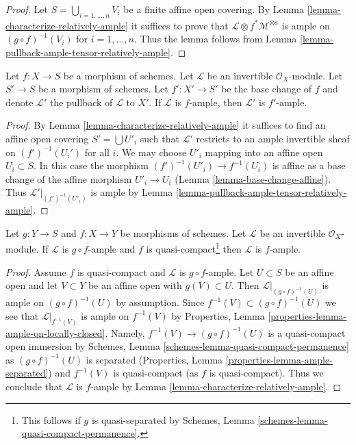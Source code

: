 \begin{proof}
Let $S = \bigcup_{i = 1, \ldots, n} V_i$ be a finite affine open covering.
By Lemma \ref{lemma-characterize-relatively-ample}
it suffices to prove that 
$\mathcal{L} \otimes f^*\mathcal{M}^{\otimes a}$
is ample on $(g \circ f)^{-1}(V_i)$ for $i = 1, \ldots, n$.
Thus the lemma follows from
Lemma \ref{lemma-pullback-ample-tensor-relatively-ample}.
\end{proof}

\begin{lemma}
\label{lemma-ample-base-change}
Let $f : X \to S$ be a morphism of schemes.
Let $\mathcal{L}$ be an invertible $\mathcal{O}_X$-module.
Let $S' \to S$ be a morphism of schemes.
Let $f' : X' \to S'$ be the base change of $f$ and denote
$\mathcal{L}'$ the pullback of $\mathcal{L}$ to $X'$.
If $\mathcal{L}$ is $f$-ample, then $\mathcal{L}'$ is $f'$-ample.
\end{lemma}

\begin{proof}
By Lemma \ref{lemma-characterize-relatively-ample} it suffices
to find an affine open covering $S' = \bigcup U'_i$
such that $\mathcal{L}'$ restricts to an ample invertible
sheaf on $(f')^{-1}(U_i')$ for all $i$. We may choose $U'_i$
mapping into an affine open $U_i \subset S$. In this case the
morphism $(f')^{-1}(U'_i) \to f^{-1}(U_i)$ is affine as a base
change of the affine morphism $U'_i \to U_i$
(Lemma \ref{lemma-base-change-affine}). Thus
$\mathcal{L}'|_{(f')^{-1}(U'_i)}$ is ample by
Lemma \ref{lemma-pullback-ample-tensor-relatively-ample}.
\end{proof}

\begin{lemma}
\label{lemma-ample-permanence}
Let $g : Y \to S$ and $f : X \to Y$ be morphisms of schemes.
Let $\mathcal{L}$ be an invertible $\mathcal{O}_X$-module.
If $\mathcal{L}$ is $g \circ f$-ample and $f$ is
quasi-compact\footnote{This follows if $g$ is quasi-separated by
Schemes, Lemma \ref{schemes-lemma-quasi-compact-permanence}.}
then $\mathcal{L}$ is $f$-ample.
\end{lemma}

\begin{proof}
Assume $f$ is quasi-compact and $\mathcal{L}$ is $g \circ f$-ample.
Let $U \subset S$ be an affine open and let $V \subset Y$ be
an affine open with $g(V) \subset U$.
Then $\mathcal{L}|_{(g \circ f)^{-1}(U)}$ is ample on
$(g \circ f)^{-1}(U)$ by assumption.
Since $f^{-1}(V) \subset (g \circ f)^{-1}(U)$ we see that
$\mathcal{L}|_{f^{-1}(V)}$ is ample on $f^{-1}(V)$ by
Properties, Lemma \ref{properties-lemma-ample-on-locally-closed}.
Namely, $f^{-1}(V) \to (g \circ f)^{-1}(U)$ is a quasi-compact
open immersion by
Schemes, Lemma \ref{schemes-lemma-quasi-compact-permanence}
as $(g \circ f)^{-1}(U)$ is separated
(Properties, Lemma \ref{properties-lemma-ample-separated})
and $f^{-1}(V)$ is quasi-compact (as $f$ is quasi-compact).
Thus we conclude that $\mathcal{L}$ is $f$-ample by
Lemma \ref{lemma-characterize-relatively-ample}.
\end{proof}







